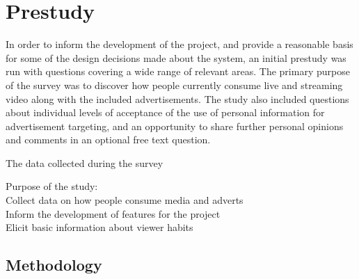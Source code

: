 \section{Prestudy}
\label{sec:prestudy}
In order to inform the development of the project, and provide a reasonable basis for some of the design decisions made about the system, an initial prestudy was run with questions covering a wide range of relevant areas. The primary purpose of the survey was to discover how people currently consume live and streaming video along with the included advertisements. The study also included questions about individual levels of acceptance of the use of personal information for advertisement targeting, and an opportunity to share further personal opinions and comments in an optional free text question.

The data collected during the survey 





Purpose of the study:\\
Collect data on how people consume media and adverts\\
Inform the development of features for the project\\
Elicit basic information about viewer habits

\subsection{Methodology}

